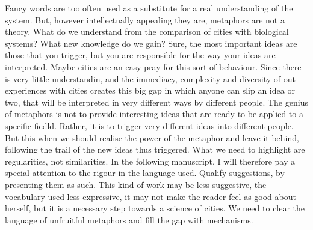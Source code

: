 Fancy words are too often used as a substitute for a real
understanding of the system. But, however intellectually appealing they are,
metaphors are not a theory. What do we understand from the comparison of cities
with biological systems? What new knowledge do we gain? Sure, the most important
ideas are those that you trigger, but you are responsible for the way your ideas
are interpreted.  Maybe cities are an easy pray for this sort of behaviour.
Since there is very little understandin, and the immediacy, complexity and
diversity of out experiences with cities creates this big gap in which anyone
can slip an idea or two, that will be interpreted in very different ways by
different people. The genius of metaphors is not to provide interesting ideas
that are ready to be applied to a specific fiedld. Rather, it is to trigger very
different ideas into different people. But this when we should realise the power
of the metaphor and leave it behind, following the trail of the new ideas thus
triggered. What we need to highlight are regularities, not similarities.
In the following manuscript, I will therefore pay a special attention to the
rigour in the language used. Qualify suggestions, by presenting them as such.
This kind of work may be less suggestive, the vocabulary used less expressive,
it may not make the reader feel as good about herself, but it is a necessary
step towards a science of cities. We need to clear the language of unfruitful
metaphors and fill the gap with mechanisms.
